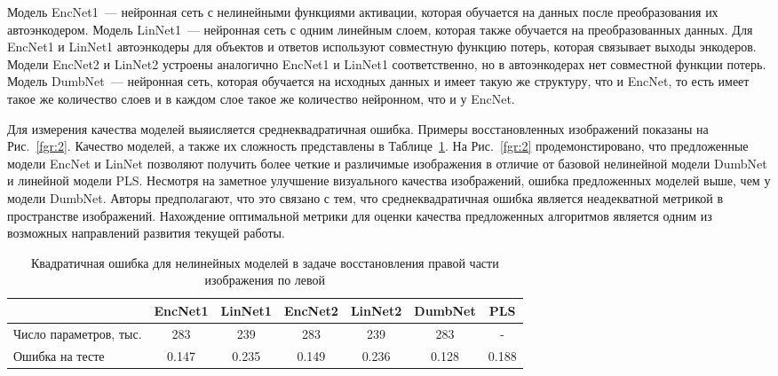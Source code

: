 \documentclass[12pt]{article}
\begin{document}
	Модель EncNet1~--- нейронная сеть с нелинейными функциями активации, которая обучается на данных после преобразования их автоэнкодером. Модель LinNet1~--- нейронная сеть с одним линейным слоем, которая также обучается на преобразованных данных. Для EncNet1 и LinNet1 автоэнкодеры для объектов и ответов используют совместную функцию потерь, которая связывает выходы энкодеров. Модели EncNet2 и LinNet2 устроены аналогично EncNet1 и LinNet1 соответственно, но в автоэнкодерах нет совместной функции потерь. Модель DumbNet~---  нейронная сеть, которая обучается на исходных данных и имеет такую же структуру, что и EncNet, то есть имеет такое же количество слоев и в каждом слое такое же количество нейронном, что и у EncNet.
	
	Для измерения качества моделей выяисляется среднеквадратичная ошибка. Примеры восстановленных изображений показаны на Рис.~\ref{fgr:2}. Качество моделей, а также их сложность представлены в Таблице~\ref{tbl:2}. 
	На Рис.~\ref{fgr:2} продемонстировано, что предложенные модели EncNet и LinNet позволяют получить более четкие и различимые изображения в отличие от базовой нелинейной модели DumbNet и линейной модели PLS.
	Несмотря на заметное улучшение визуального качества изображений, ошибка предложенных моделей выше, чем у модели DumbNet. 
	Авторы предполагают, что это связано с тем, что среднеквадратичная ошибка является неадекватной метрикой в пространстве изображений.
	Нахождение оптимальной метрики для оценки качества предложенных алгоритмов является одним из возможных направлений развития текущей работы.
	
	\begin{table}[h!]
		\caption{Квадратичная ошибка для нелинейных моделей в задаче восстановления правой части изображения по левой}
		\centering
		\begin{tabular}{l|cccccc}
			\hline
			& EncNet1 & LinNet1 & EncNet2 & LinNet2 & DumbNet & PLS\\  \hline
			Число параметров, тыс. & 283 & 239 & 283 & 239  & 283 & -\\ 
			Ошибка на тесте & 0.147 & 0.235 & 0.149 & 0.236 & 0.128 & 0.188 \\ 
			\hline
		\end{tabular}
		\label{tbl:2}
	\end{table}
	
\end{document}
